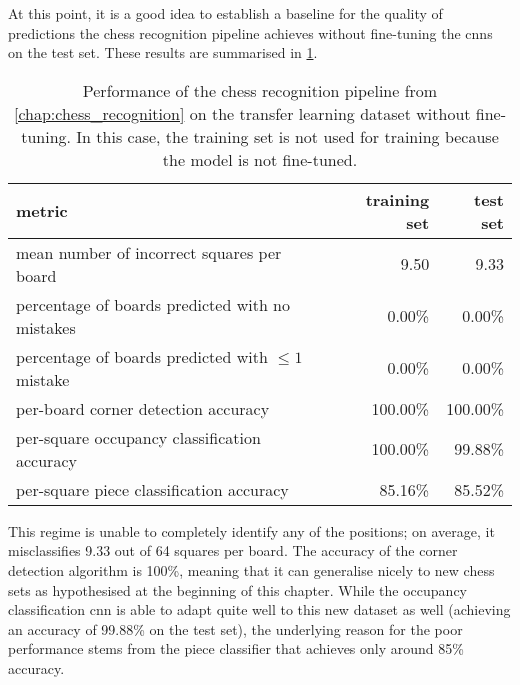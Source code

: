 \documentclass[../main.tex]{subfiles}
\begin{document}
At this point, it is a good idea to establish a baseline for the quality of predictions the chess recognition pipeline achieves without fine-tuning the \glspl{cnn} on the test set.
These results are summarised in \cref{tbl:transfer_learning_results_without_finetuning}.
\begin{table}
    \centering
    \begin{tabular}{lrr}
        \toprule
        metric & training set & test set \\
        \midrule
        mean number of incorrect squares per board           & 9.50     & 9.33 \\
        percentage of boards predicted with no mistakes      & 0.00\%   & 0.00\%   \\
        percentage of boards predicted with $\leq 1$ mistake & 0.00\%   & 0.00\%   \\
        per-board corner detection accuracy                  & 100.00\% & 100.00\% \\
        per-square occupancy classification accuracy         & 100.00\% & 99.88\% \\
        per-square piece classification accuracy             & 85.16\%  & 85.52\% \\
        \bottomrule
    \end{tabular}
    \caption[Performance of the chess recognition pipeline from \cref{chap:chess_recognition} on the transfer learning dataset without fine-tuning.]{Performance of the chess recognition pipeline from \cref{chap:chess_recognition} on the transfer learning dataset without fine-tuning. In this case, the training set is not used for training because the model is not fine-tuned.}
    \label{tbl:transfer_learning_results_without_finetuning}
\end{table}
This regime is unable to completely identify any of the positions; on average, it misclassifies 9.33 out of 64 squares per board.
The accuracy of the corner detection algorithm is 100\%, meaning that it can generalise nicely to new chess sets as hypothesised at the beginning of this chapter.
While the occupancy classification \gls{cnn} is able to adapt quite well to this new dataset as well (achieving an accuracy of 99.88\% on the test set), the underlying reason for the poor performance stems from the piece classifier that achieves only around 85\% accuracy.
\end{document}
